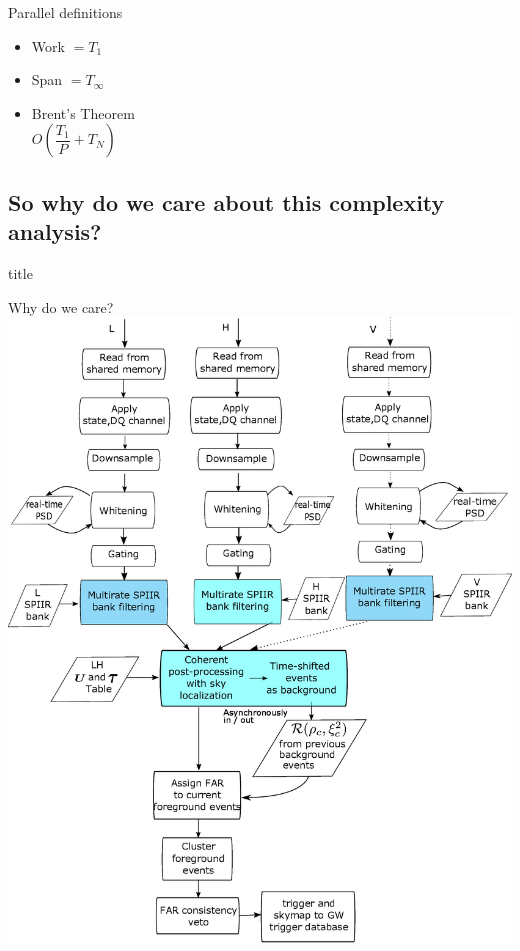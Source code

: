 \documentclass{beamer}
\begin{document}
\begin{frame}{Parallel definitions}
    \begin{itemize}
        \item Work \( = T_1\)
        \item Span \( = T_\infty\)
        \item Brent's Theorem\\
            \(O(\dfrac{T_1}{P} + T_N)\)
    \end{itemize}
\end{frame}

\subsection{So why do we care about this complexity analysis?}

\begin{frame}
  \vfill
  \centering
  \begin{beamercolorbox}[sep=8pt,center,shadow=true,rounded=true]{title}
    \insertsubsectionhead\par%
  \end{beamercolorbox}
  \vfill
\end{frame}

\begin{frame}{Why do we care?}
    \centering
    \includegraphics[height=0.7\textheight]{online_xdet.jpg}
\end{frame}
\end{document}

